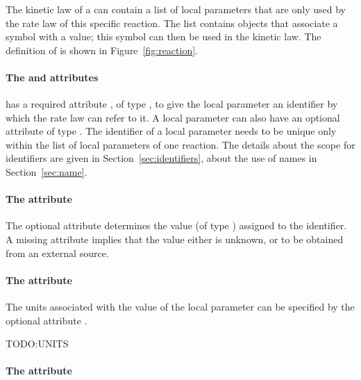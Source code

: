 \subsubsection{}
\label{subsec:localparameter}

The kinetic law of a \Reaction can contain a list of local parameters that
are only used by the rate law of this specific reaction. The list contains
\LocalParameter objects that associate a symbol  with a
value; this symbol can then be used in the kinetic law. 
The definition of \LocalParameter is shown in Figure~\vref{fig:reaction}.

\paragraph{The  and  attributes}

\LocalParameter has a required attribute , of type
, to give the local parameter an identifier by which
the rate law can refer to it.  A local
parameter can also have an optional  attribute of type
.  The identifier of a local parameter needs to be 
unique only within the list of local parameters of one reaction. The details 
about the scope for identifiers are given in Section~\ref{sec:identifiers}, about
the use of names in Section~\ref{sec:name}.

\paragraph{The  attribute}

The optional attribute  determines the value (of type
) assigned to the identifier.  A missing
 attribute implies that the value either is unknown, or
to be obtained from an external source.

\paragraph{The  attribute}

The units associated with the value of the local parameter can be specified
by the optional attribute . 

TODO:UNITS


\paragraph{The  attribute}

